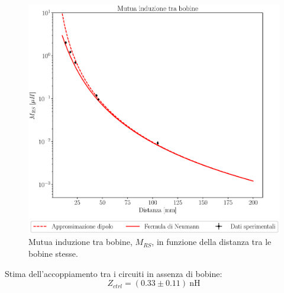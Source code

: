 \documentclass{article}
\begin{document}
\begin{figure}[h!]
    \centering
    \includegraphics[scale = 0.55]{Grafici/induttanza.eps}
    \caption{Mutua induzione tra bobine, $M_{RS}$, in funzione della distanza tra le bobine stesse.}
    \label{fig:induzione}
\end{figure}
Stima dell'accoppiamento tra i circuiti in assenza di bobine:
$$ Z_{ctrl} = (0.33\pm0.11)~\si{\nano\henry}$$
\end{document}
